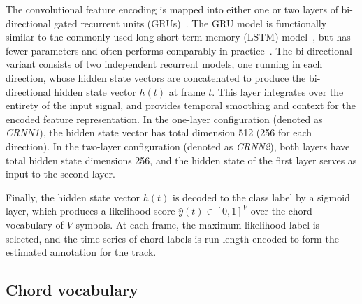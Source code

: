 \documentclass{article}
\begin{document}


The convolutional feature encoding is mapped into either one or two layers of bi-directional gated recurrent units (GRUs)~\cite{cho2014learning}.
The GRU model is functionally similar to the commonly used long-short-term memory (LSTM) model~\cite{hochreiter1997long}, but has fewer parameters and often performs comparably in practice~\cite{jozefowicz2015empirical}.
The bi-directional variant consists of two independent recurrent models, one running in each direction, whose hidden state vectors are concatenated to produce the bi-directional hidden state vector $h(t)$ at frame $t$.
This layer integrates over the entirety of the input signal, and provides temporal smoothing and context for the encoded feature representation.
In the one-layer configuration (denoted as \emph{CRNN1}), the hidden state vector has total dimension 512 (256 for each direction).
In the two-layer configuration (denoted as \emph{CRNN2}), both layers have total hidden state dimensions 256, and the hidden state of the first layer serves as input to the second layer.


Finally, the hidden state vector $h(t)$ is decoded to the class label by a sigmoid layer, which produces a likelihood score $\hat{y}(t) \in [0, 1]^{V}$ over the chord vocabulary of $V$ symbols.
At each frame, the maximum likelihood label is selected, and the time-series of chord labels is run-length encoded to form the estimated annotation for the track.










\subsection{Chord vocabulary}

\label{sec:vocab}
%
\end{document}
